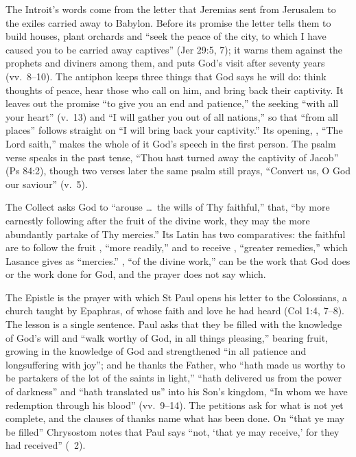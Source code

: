 The Introit's words come from the letter that Jeremias sent from Jerusalem to
the exiles carried away to Babylon. Before its promise the letter tells them
to build houses, plant orchards and ``seek the peace of the city, to which I
have caused you to be carried away captives'' (Jer 29:5, 7); it warns them
against the prophets and diviners among them, and puts God's visit after
seventy years (vv.~8--10). The antiphon keeps three things that God says he
will do: think thoughts of peace, hear those who call on him, and bring back
their captivity. It leaves out the promise ``to give you an end and
patience,'' the seeking ``with all your heart'' (v.~13) and ``I will gather
you out of all nations,'' so that ``from all places'' follows straight on ``I
will bring back your captivity.'' Its opening, , ``The
Lord saith,'' makes the whole of it God's speech in the first person. The
psalm verse speaks in the past tense, ``Thou hast turned away the captivity of
Jacob'' (Ps 84:2), though two verses later the same psalm still prays,
``Convert us, O God our saviour'' (v.~5).

The Collect asks God to ``arouse \dots\ the wills of Thy faithful,'' that,
``by more earnestly following after the fruit of the divine work, they may the
more abundantly partake of Thy mercies.'' Its Latin has two comparatives: the
faithful are to follow the fruit , ``more readily,'' and to
receive , ``greater remedies,'' which Lasance gives as
``mercies.'' , ``of the divine work,'' can be the work
that God does or the work done for God, and the prayer does not say which.

The Epistle is the prayer with which St Paul opens his letter to the
Colossians, a church taught by Epaphras, of whose faith and love he had heard
(Col 1:4, 7--8). The lesson is a single sentence. Paul asks that they be
filled with the knowledge of God's will and ``walk worthy of God, in all
things pleasing,'' bearing fruit, growing in the knowledge of God and
strengthened ``in all patience and longsuffering with joy''; and he thanks the
Father, who ``hath made us worthy to be partakers of the lot of the saints in
light,'' ``hath delivered us from the power of darkness'' and ``hath
translated us'' into his Son's kingdom, ``In whom we have redemption through
his blood'' (vv.~9--14). The petitions ask for what is not yet complete, and
the clauses of thanks name what has been done. On ``that ye may be filled''
Chrysostom notes that Paul says ``not, `that ye may receive,' for they had
received'' (~2).

